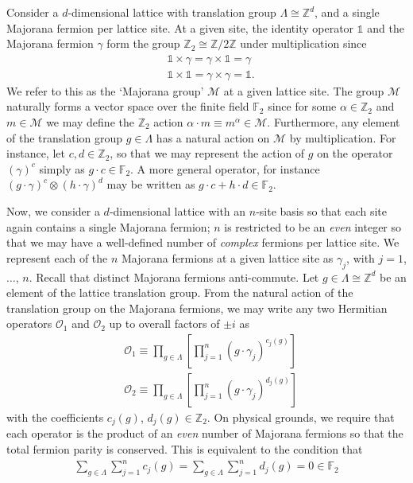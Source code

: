 \documentclass[aps,twocolumn,preprintnumbers,floatfix,showpacs,prx]{revtex4-1}
\begin{document}
Consider a $d$-dimensional lattice with translation group $\Lambda \cong \mathbb{Z}^{d}$, and a single Majorana fermion per lattice site.  At a given site, the identity operator $\mathds{1}$ and the Majorana fermion $\gamma$ form the group $\mathbb{Z}_{2}\cong \mathbb{Z}/2\mathbb{Z}$ under multiplication since 
\begin{align}
&\mathds{1} \times \gamma = \gamma \times \mathds{1} = \gamma\\
&\mathds{1} \times \mathds{1} = \gamma \times \gamma = \mathds{1}.
\end{align}
We refer to this as the `Majorana group' $\mathcal{M}$ at a given lattice site.  The group $\mathcal{M}$ naturally forms a vector space over the finite field $\mathbb{F}_{2}$ since for some $\alpha\in\mathbb{Z}_{2}$ and $m\in \mathcal{M}$ we may define the $\mathbb{Z}_{2}$ action $\alpha\cdot m \equiv m^{\alpha} \in \mathcal{M}$.  Furthermore, any element of the translation group $g\in\Lambda$ has a natural action on $\mathcal{M}$ by multiplication.  For instance, let $c, d\in\mathbb{Z}_{2}$, so that we may represent the action of $g$ on the operator $(\gamma)^{c}$ simply as $g\cdot c\in\mathbb{F}_{2}$. A more general operator, for instance $(g\cdot \gamma)^{c}\otimes(h\cdot\gamma)^{d}$ may be written as $g\cdot c + h\cdot d\in\mathbb{F}_{2}$.

Now, we consider a $d$-dimensional lattice with an $n$-site basis so that each site again contains a single Majorana fermion; $n$ is restricted to be an \emph{even} integer so that we may have a well-defined number of \emph{complex} fermions per lattice site. We represent each of the $n$ Majorana fermions at a given lattice site as $\gamma_{j}$, with $j = 1$, $\ldots$, $n$.  Recall that distinct Majorana fermions anti-commute.  Let $g\in\Lambda\cong\mathbb{Z}^{d}$ be an element of the lattice translation group.  From the natural action of the translation group on the Majorana fermions, we may write any two Hermitian operators $\mathcal{O}_{1}$ and $\mathcal{O}_{2}$ up to overall factors of $\pm i$ as
\begin{align}
&\mathcal{O}_{1} \equiv \prod_{g\in\Lambda}\left[\prod_{j = 1}^{n}\left(g\cdot\gamma_{j}\right)^{c_{j}(g)}\right]\\
&\mathcal{O}_{2} \equiv \prod_{g\in\Lambda}\left[\prod_{j = 1}^{n}\left(g\cdot\gamma_{j}\right)^{d_{j}(g)}\right]
\end{align}
with the coefficients $c_{j}(g)$, $d_{j}(g)\in\mathbb{Z}_{2}$.  On physical grounds, we require that each operator is the product of an \emph{even} number of Majorana fermions so that the total fermion parity is conserved.  This is equivalent to the condition that
\begin{align}
\sum_{g\in\Lambda}\sum_{j = 1}^{n}c_{j}(g) = \sum_{g\in\Lambda}\sum_{j = 1}^{n}d_{j}(g) = 0 \in\mathbb{F}_{2}
\end{align}
\end{document}
